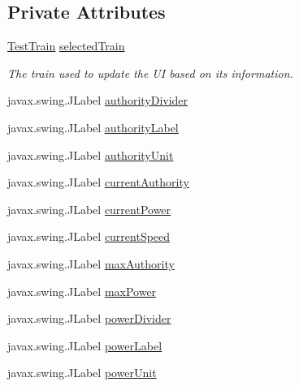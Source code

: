 \subsection*{Private Attributes}
\begin{DoxyCompactItemize}
\item 
\hyperlink{classTrainControllerComps_1_1TestTrain}{Test\+Train} \hyperlink{classTrainControllerComps_1_1TCTrainInfoPane_ae4816b54fe2e5f0e0d81d1dd3ab03c30}{selected\+Train}
\begin{DoxyCompactList}\small\item\em The train used to update the UI based on its information. \end{DoxyCompactList}\item 
javax.\+swing.\+J\+Label \hyperlink{classTrainControllerComps_1_1TCTrainInfoPane_a733e39ce58b6d8707aeadf9ba081945d}{authority\+Divider}
\item 
javax.\+swing.\+J\+Label \hyperlink{classTrainControllerComps_1_1TCTrainInfoPane_ad3834c784cc325e3d9a760e206926bbe}{authority\+Label}
\item 
javax.\+swing.\+J\+Label \hyperlink{classTrainControllerComps_1_1TCTrainInfoPane_a85f02470ad2e701f9b3a4d59a238621d}{authority\+Unit}
\item 
javax.\+swing.\+J\+Label \hyperlink{classTrainControllerComps_1_1TCTrainInfoPane_acf3b7428f9c5c582e82d08e0bdba9d6f}{current\+Authority}
\item 
javax.\+swing.\+J\+Label \hyperlink{classTrainControllerComps_1_1TCTrainInfoPane_ad703e120928f8a764cbca4941c7ea430}{current\+Power}
\item 
javax.\+swing.\+J\+Label \hyperlink{classTrainControllerComps_1_1TCTrainInfoPane_a23261167c5a4108920049381ef5a9149}{current\+Speed}
\item 
javax.\+swing.\+J\+Label \hyperlink{classTrainControllerComps_1_1TCTrainInfoPane_aad833d5c75b6a626a8bb4e58f396eb92}{max\+Authority}
\item 
javax.\+swing.\+J\+Label \hyperlink{classTrainControllerComps_1_1TCTrainInfoPane_a18fc7fcbd582f9aea6b9afba7a7f1eb1}{max\+Power}
\item 
javax.\+swing.\+J\+Label \hyperlink{classTrainControllerComps_1_1TCTrainInfoPane_ac969dbb23d7883d2aae970c6b564790b}{power\+Divider}
\item 
javax.\+swing.\+J\+Label \hyperlink{classTrainControllerComps_1_1TCTrainInfoPane_a22c155dab57f64948d34bd5f8457eeed}{power\+Label}
\item 
javax.\+swing.\+J\+Label \hyperlink{classTrainControllerComps_1_1TCTrainInfoPane_a56aeb864b027cbcdd3981a4c73159f0d}{power\+Unit}

\end{DoxyCompactItemize}

